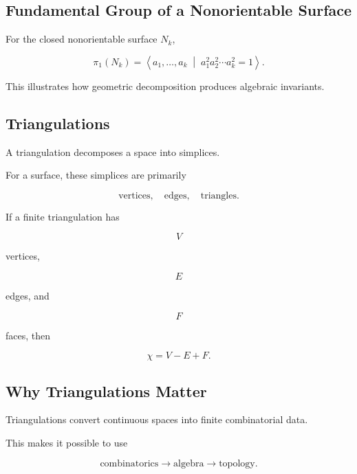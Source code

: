 \subsection{Fundamental Group of a Nonorientable Surface}
\label{subsec:fundamental-group-nonorientable-surface}

For the closed nonorientable surface \(N_k\),

\[
\boxed{
\pi_1(N_k)
=
\left\langle
a_1,\ldots,a_k
\;\middle|\;
a_1^2a_2^2\cdots a_k^2=1
\right\rangle.
}
\]

This illustrates how geometric decomposition produces algebraic invariants.

\subsection{Triangulations}
\label{subsec:triangulations-geometric-topology}

A triangulation decomposes a space into simplices.

For a surface, these simplices are primarily

\[
\boxed{
\text{vertices},
\quad
\text{edges},
\quad
\text{triangles}.
}
\]

If a finite triangulation has

\[
V
\]

vertices,

\[
E
\]

edges, and

\[
F
\]

faces, then

\[
\boxed{
\chi=V-E+F.
}
\]

\subsection{Why Triangulations Matter}
\label{subsec:why-triangulations-matter}

Triangulations convert continuous spaces into finite combinatorial data.

This makes it possible to use

\[
\boxed{
\text{combinatorics}
\longrightarrow
\text{algebra}
\longrightarrow
\text{topology}.
}
\]

